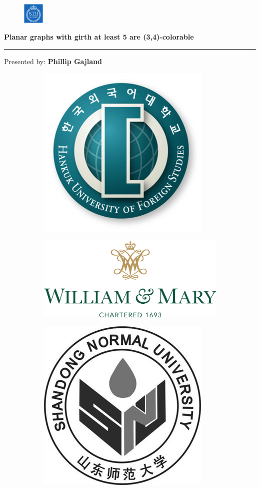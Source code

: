 \documentclass[10pt, compress]{beamer}
\begin{document}
\begin{frame}[plain,t]

\begin{figure}
\begin{flushright}
\vspace{-2cm}
\includegraphics[width = 10mm]{figures/kth_logo.png}
\end{flushright}
\end{figure}

\vspace{2cm}

{\large\textbf{Planar graphs with girth at least 5 are (3,4)-colorable}}
\\\rule{10.25cm}{1pt}

\vspace{0.5cm}

{\large Presented by: \textbf{Phillip Gajland}}

\begin{figure}
\centering
\begin{subfigure}{.3\textwidth}
\centering
\includegraphics[width=.3\linewidth]{figures/logo1.png}
\end{subfigure}%
\begin{subfigure}{.3\textwidth}
\centering
\includegraphics[width=.3\linewidth]{figures/logo2.png}
\end{subfigure}%
\begin{subfigure}{.3\textwidth}
\centering
\includegraphics[width=.3\linewidth]{figures/logo3.jpg}
\end{subfigure}
\end{figure}


\end{frame}
\end{document}
